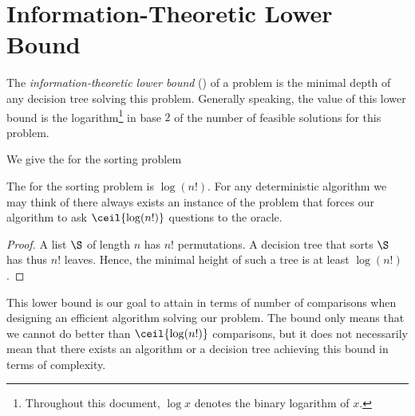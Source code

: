 \section{Information-Theoretic Lower Bound}
\label{tree:sorting:ITLB}

The \emph{information-theoretic lower bound} (\ITLB) of a problem
is the minimal depth of any
decision tree solving this problem. Generally speaking, the value of this lower
bound is the logarithm\footnote{Throughout this document, \(\log x\) denotes the binary logarithm of \(x\).}
in base \(2\) of the number of feasible solutions for this problem.

We give the \ITLB for the sorting problem
\begin{theorem}
The \ITLB for the sorting problem is
\(\log(n!)\). For any deterministic algorithm we may think of
there always exists an instance of the problem that forces our
algorithm to ask \(\ceil{\log(n!)}\) questions to the oracle.
\end{theorem}
\begin{proof}
A list \(\S\) of length \(n\) has \(n!\) permutations. A decision tree that sorts
\(\S\) has thus
\(n!\) leaves. Hence, the minimal height of such a tree is at least \(\log(n!)\).
\end{proof}

This lower bound is our goal to attain in terms of number of comparisons
when designing an efficient algorithm solving our problem. The bound only means
that we cannot do better than \(\ceil{\log(n!)}\) comparisons, but it does not
necessarily mean that there exists an algorithm or a decision tree achieving
this bound in terms of complexity.
